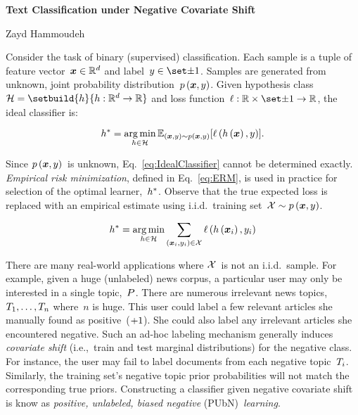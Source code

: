 \documentclass[10pt]{article}
\begin{document}
  \begin{center}
    {\Large \textbf{Text Classification under Negative Covariate Shift}}

    \vspace{6pt}{\large Project Proposal}

    \vspace{6pt}Zayd Hammoudeh
  \end{center}

  Consider the task of binary (supervised) classification.  Each sample is a tuple of feature vector~${\boldsymbol{x} \in \mathbb{R}^{d}}$ and label~${\y \in \lbls}$.  Samples are generated from unknown, joint probability distribution~$p\left(\boldsymbol{x},y\right)$.  Given hypothesis class~${\hypoCls=\setbuild{\dec}{\func{\dec}{\domain}{\real}}}$ and loss function~$\func{\loss}{\real \times \lbls}{\real}$, the ideal classifier is:

  \begin{equation}\label{eq:IdealClassifier}
    h^{*} = \operatorname*{arg\,min}_{h \in \mathcal{H}} \mathbb{E}_{(\boldsymbol{x}, y) \sim p\left(\boldsymbol{x},y\right)} \lbrack\ell\left(h\left(\boldsymbol{x}\right), y\right)\rbrack\text{.}
  \end{equation}

  Since $p\left(\boldsymbol{x},y\right)$~is unknown, Eq.~\eqref{eq:IdealClassifier} cannot be determined exactly.  \textit{Empirical risk minimization}, defined in Eq.~\eqref{eq:ERM}, is used in practice for selection of the optimal learner,~${h^{*}}$. Observe that the true expected loss is replaced with an empirical estimate using i.i.d.\ training set~${\mathcal{X} \sim p\left(\boldsymbol{x},y\right)}$.

  \begin{equation}\label{eq:ERM}
    h^{*} = \operatorname*{arg\,min}_{h \in \mathcal{H}} \sum_{(\boldsymbol{x}_i,y_i) \in \mathcal{X}} \ell\left(h\left(\boldsymbol{x}_i\right), y_i\right)
  \end{equation}

  There are many real-world applications where $\mathcal{X}$~is not an i.i.d.\ sample. For example, given a huge (unlabeled) news corpus, a particular user may only be interested in a single topic,~$P$.  There are numerous irrelevant news topics,~${T_1,\ldots,T_n}$ where~$n$ is huge.  This user could label a few relevant articles she manually found as positive~(${+}1$). She could also label any irrelevant articles she encountered negative. Such an ad-hoc labeling mechanism generally induces \textit{covariate shift} (i.e.,~train and test marginal distributions) for the negative class. For instance, the user may fail to label documents from each negative topic~$T_i$. Similarly, the training set's negative topic prior probabilities will not match the corresponding true priors. Constructing a classifier given negative covariate shift is know as \textit{positive, unlabeled, biased negative} (PUbN)~\textit{learning}.
\end{document}
